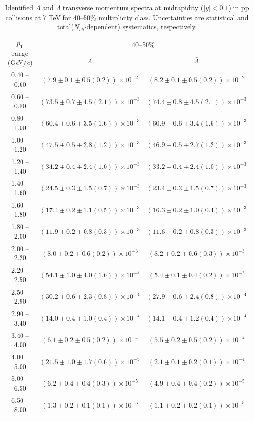 \begin{table}
\caption{Identified $\Lambda$ and $\bar{\Lambda}$  transverse momentum spectra at midrapidity ($|y|<0.1$) in pp collisions at 7 TeV for 40--50\% multiplicity class. Uncertainties are statistical and total($N_{ch}$-dependent) systematics, respectively.}
\label{tab:Lambda_AntiLambda_40to50}
\begin{center}
\begin{tabular}{ c | c c }
\hline
\multirow{2}{*}{$p_{\mathrm{T}}$ range (GeV/\textit{c})} & \multicolumn{2}{c}{40--50\%} \\ & $\Lambda$& $\bar{\Lambda}$\\ 
\hline
0.40 -- 0.60 & $(7.9\pm0.1\pm0.5(0.2))\times10^{-2}$ & $(8.2\pm0.1\pm0.5(0.2))\times10^{-2}$ \\ 
0.60 -- 0.80 & $(73.5\pm0.7\pm4.5(2.1))\times10^{-3}$ & $(74.4\pm0.8\pm4.5(2.1))\times10^{-3}$ \\ 
0.80 -- 1.00 & $(60.4\pm0.6\pm3.5(1.6))\times10^{-3}$ & $(60.9\pm0.6\pm3.4(1.6))\times10^{-3}$ \\ 
1.00 -- 1.20 & $(47.5\pm0.5\pm2.8(1.2))\times10^{-3}$ & $(46.9\pm0.5\pm2.7(1.2))\times10^{-3}$ \\ 
1.20 -- 1.40 & $(34.2\pm0.4\pm2.4(1.0))\times10^{-3}$ & $(33.2\pm0.4\pm2.4(1.0))\times10^{-3}$ \\ 
1.40 -- 1.60 & $(24.5\pm0.3\pm1.5(0.7))\times10^{-3}$ & $(23.4\pm0.3\pm1.5(0.7))\times10^{-3}$ \\ 
1.60 -- 1.80 & $(17.4\pm0.2\pm1.1(0.5))\times10^{-3}$ & $(16.3\pm0.2\pm1.0(0.4))\times10^{-3}$ \\ 
1.80 -- 2.00 & $(11.9\pm0.2\pm0.8(0.3))\times10^{-3}$ & $(11.6\pm0.2\pm0.8(0.3))\times10^{-3}$ \\ 
2.00 -- 2.20 & $(8.0\pm0.2\pm0.6(0.2))\times10^{-3}$ & $(8.2\pm0.2\pm0.6(0.3))\times10^{-3}$ \\ 
2.20 -- 2.50 & $(54.1\pm1.0\pm4.0(1.6))\times10^{-4}$ & $(5.4\pm0.1\pm0.4(0.2))\times10^{-3}$ \\ 
2.50 -- 2.90 & $(30.2\pm0.6\pm2.3(0.8))\times10^{-4}$ & $(27.9\pm0.6\pm2.4(0.8))\times10^{-4}$ \\ 
2.90 -- 3.40 & $(14.0\pm0.4\pm1.0(0.4))\times10^{-4}$ & $(14.1\pm0.4\pm1.2(0.4))\times10^{-4}$ \\ 
3.40 -- 4.00 & $(6.1\pm0.2\pm0.5(0.2))\times10^{-4}$ & $(5.5\pm0.2\pm0.5(0.2))\times10^{-4}$ \\ 
4.00 -- 5.00 & $(21.5\pm1.0\pm1.7(0.6))\times10^{-5}$ & $(2.1\pm0.1\pm0.2(0.1))\times10^{-4}$ \\ 
5.00 -- 6.50 & $(6.2\pm0.4\pm0.4(0.3))\times10^{-5}$ & $(4.9\pm0.4\pm0.4(0.2))\times10^{-5}$ \\ 
6.50 -- 8.00 & $(1.3\pm0.2\pm0.1(0.1))\times10^{-5}$ & $(1.1\pm0.2\pm0.2(0.1))\times10^{-5}$ \\ 
\hline
\end{tabular}
\end{center}
\end{table}
 
